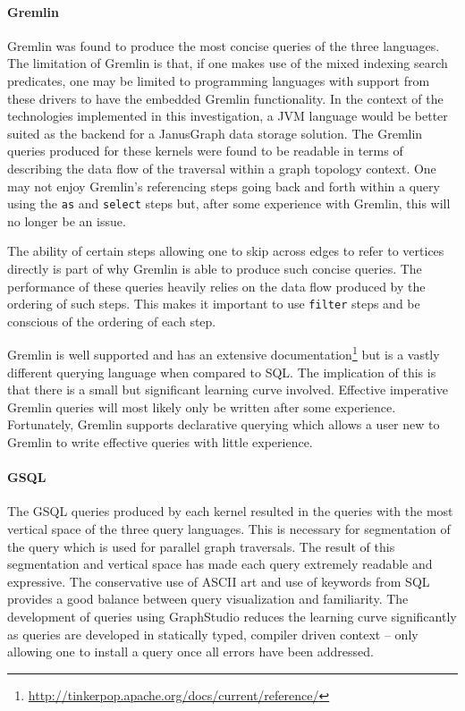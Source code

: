 \paragraph{Gremlin} 

Gremlin was found to produce the most concise queries of the three languages. The limitation of Gremlin is that, if one makes use of the mixed indexing search predicates, one may be limited to programming languages with support from these drivers to have the embedded Gremlin functionality. In the context of the technologies implemented in this investigation, a JVM language would be better suited as the backend for a JanusGraph data storage solution. The Gremlin queries produced for these kernels were found to be readable in terms of describing the data flow of the traversal within a graph topology context. One may not enjoy Gremlin's referencing steps going back and forth within a query using the \texttt{as} and \texttt{select} steps but, after some experience with Gremlin, this will no longer be an issue.

The ability of certain steps allowing one to skip across edges to refer to vertices directly is part of why Gremlin is able to produce such concise queries. The performance of these queries heavily relies on the data flow produced by the ordering of such steps. This makes it important to use \texttt{filter} steps and be conscious of the ordering of each step.

Gremlin is well supported and has an extensive documentation\footnote{\url{http://tinkerpop.apache.org/docs/current/reference/}} but is a vastly different querying language when compared to SQL. The implication of this is that there is a small but significant learning curve involved. Effective imperative Gremlin queries will most likely only be written after some experience. Fortunately, Gremlin supports declarative querying which allows a user new to Gremlin to write effective queries with little experience.

\paragraph{GSQL} 

The GSQL queries produced by each kernel resulted in the queries with the most vertical space of the three query languages. This is necessary for segmentation of the query which is used for parallel graph traversals. The result of this segmentation and vertical space has made each query extremely readable and expressive. The conservative use of ASCII art and use of keywords from SQL provides a good balance between query visualization and familiarity. The development of queries using GraphStudio reduces the learning curve significantly as queries are developed in statically typed, compiler driven context -- only allowing one to install a query once all errors have been addressed. 

